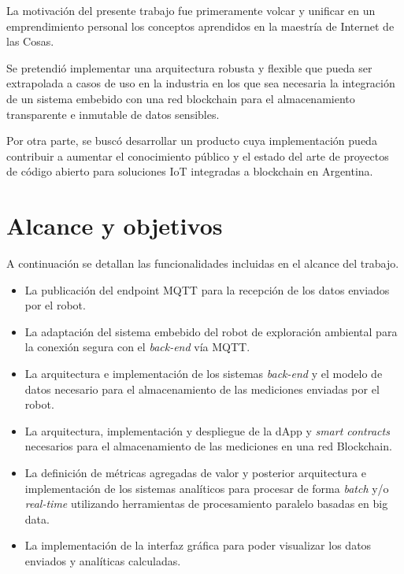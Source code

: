 La motivación del presente trabajo fue primeramente volcar y unificar en un emprendimiento personal los conceptos aprendidos en la maestría de Internet de las Cosas. 

Se pretendió implementar una arquitectura robusta y flexible que pueda ser extrapolada a casos de uso en la industria en los que sea necesaria la integración de un sistema embebido con una red blockchain para el almacenamiento transparente e inmutable de datos sensibles.  

Por otra parte, se buscó desarrollar un producto cuya implementación pueda contribuir a aumentar el conocimiento público y el estado del arte de proyectos de código abierto para soluciones IoT integradas a blockchain en Argentina.


\section{Alcance y objetivos}

A continuación se detallan las funcionalidades incluidas en el alcance del trabajo.


\begin{itemize}
	\item La publicación del endpoint MQTT \citep{mqtt_spec} para la recepción de los datos enviados por el robot.
	\item La adaptación del sistema embebido del robot de exploración ambiental para la conexión segura con el \textit{back-end} vía MQTT.
	\item La arquitectura e implementación de los sistemas \textit{back-end} y el modelo de datos necesario para el almacenamiento de las mediciones enviadas por el robot.
	\item La arquitectura, implementación y despliegue de la dApp y \textit{smart contracts} necesarios para el almacenamiento de las mediciones en una red Blockchain.
	\item La definición de métricas agregadas de valor y posterior arquitectura e implementación de los sistemas analíticos para procesar de forma \textit{batch} y/o \textit{real-time} utilizando herramientas de procesamiento paralelo basadas en big data.
	\item La implementación de la interfaz gráfica para poder visualizar los datos enviados y analíticas calculadas.

\end{itemize}




